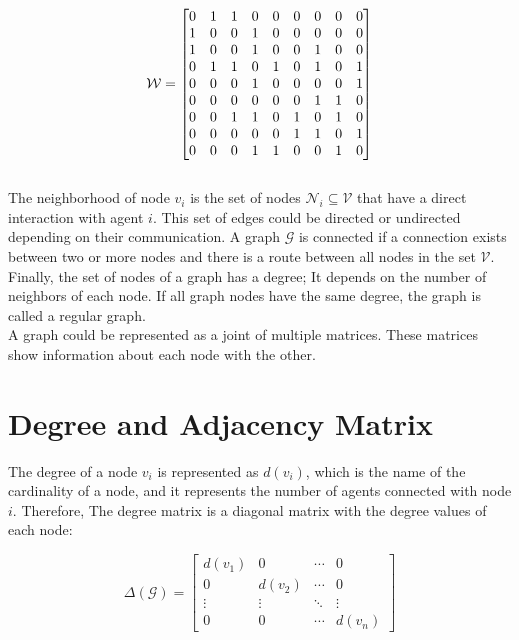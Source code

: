 \begin{equation*}
\centering
\mathcal{W} = \begin{bmatrix}
0 & 1 & 1 & 0 & 0 & 0 & 0 & 0 & 0 \\
1 & 0 & 0 & 1 & 0 & 0 & 0 & 0 & 0 \\
1 & 0 & 0 & 1 & 0 & 0 & 1 & 0 & 0 \\
0 & 1 & 1 & 0 & 1 & 0 & 1 & 0 & 1 \\
0 & 0 & 0 & 1 & 0 & 0 & 0 & 0 & 1 \\
0 & 0 & 0 & 0 & 0 & 0 & 1 & 1 & 0 \\
0 & 0 & 1 & 1 & 0 & 1 & 0 & 1 & 0 \\
0 & 0 & 0 & 0 & 0 & 1 & 1 & 0 & 1 \\
0 & 0 & 0 & 1 & 1 & 0 & 0 & 1 & 0
\end{bmatrix}
\end{equation*}
\\

The neighborhood of node $v_{i}$ is the set of nodes $\mathcal{N}_{i} \subseteq  \mathcal{V}$ that have a direct interaction with agent $i$. This set of edges could be directed or undirected depending on their communication. A graph $\mathcal{G}$ is connected if a connection exists between two or more nodes and there is a route between all nodes in the set $\mathcal{V}$. Finally, the set of nodes of a graph has a degree;  It depends on the number of neighbors of each node. If all graph nodes have the same degree, the graph is called a regular graph.\\

A graph could be represented as a joint of multiple matrices. These matrices show information about each node with the other. 






\section*{Degree and Adjacency Matrix}

The degree of a node $v_{i}$ is represented as $d(v_{i})$, which is the name of the cardinality of a node, and it represents the number of agents connected with node $i$. Therefore, The degree matrix is a diagonal matrix with the degree values of each node:

\begin{equation}
    \Delta (\mathcal{G}) = \begin{bmatrix}
d(v_{1}) &   0    &  \cdots & 0\\ 
0      & d(v_{2}) & \cdots &  0 \\ 
\vdots & \vdots   & \ddots  & \vdots\\ 
0      & 0        & \cdots & d(v_{n}) 
  \end{bmatrix}
\end{equation}


